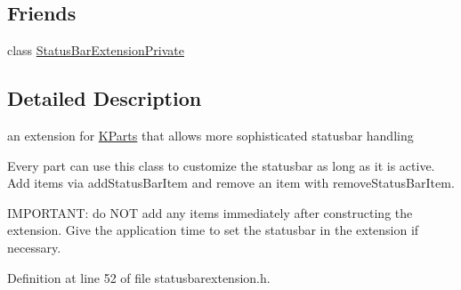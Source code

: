 \subsection*{\-Friends}
\begin{DoxyCompactItemize}
\item 
class \hyperlink{classKParts_1_1StatusBarExtension_ad7fbe21a7ea073280f28211d53f7d775}{\-Status\-Bar\-Extension\-Private}
\end{DoxyCompactItemize}


\subsection{\-Detailed \-Description}
an extension for \hyperlink{namespaceKParts}{\-K\-Parts} that allows more sophisticated statusbar handling 

\-Every part can use this class to customize the statusbar as long as it is active. \-Add items via add\-Status\-Bar\-Item and remove an item with remove\-Status\-Bar\-Item.

\-I\-M\-P\-O\-R\-T\-A\-N\-T\-: do \-N\-O\-T add any items immediately after constructing the extension. \-Give the application time to set the statusbar in the extension if necessary. 

\-Definition at line 52 of file statusbarextension.\-h.



